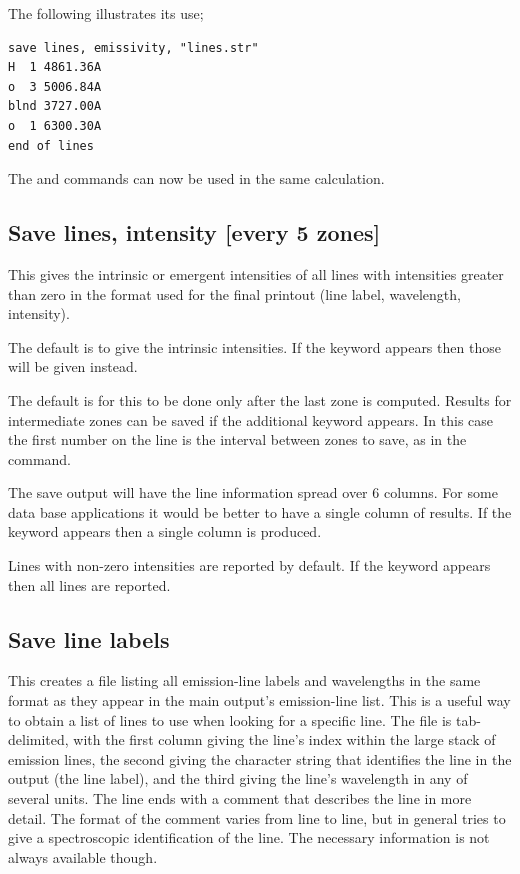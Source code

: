 The following illustrates its use;
\begin{verbatim}
save lines, emissivity, "lines.str"
H  1 4861.36A
o  3 5006.84A
blnd 3727.00A
o  1 6300.30A
end of lines
\end{verbatim}

The  and  commands can now be used in the same calculation.

\subsection{Save lines, intensity [every 5 zones]}

This gives the
intrinsic or emergent intensities of all lines with
intensities greater than zero in the format used for the final printout
(line label, wavelength, intensity).

The default is to give the intrinsic intensities.
If the keyword  appears then
those will be given instead.

The default is for this to be done
only after the last zone is computed.  Results for intermediate zones can
be saved if the additional keyword  appears.
In this case the first
number on the line is the interval between zones to save,
as in the  command.

The save output will have the line information spread over 6 columns.
For some data base applications it would be better to have a single column
of results.  If the keyword  appears then a single column is produced.

Lines with non-zero intensities are reported by default.  
If the keyword  appears then all lines are reported.

\subsection{Save line labels}
\label{sec:SaveLineLabels}

This creates a file listing all emission-line labels and wavelengths
in the same format as they appear in the main output's emission-line list.
This is a useful way to obtain a list of lines to use when looking for a
specific line.  The file is tab-delimited, with the first column giving
the line's index within the large stack of emission lines, the second giving
the character string that identifies the line in the output (the line label), and the third giving
the line's wavelength in any of several units.  The line ends with a
comment that describes the line in more detail.  The format of the comment
varies from line to line, but in general tries to give a spectroscopic
identification of the line. The necessary information is not always available though.

